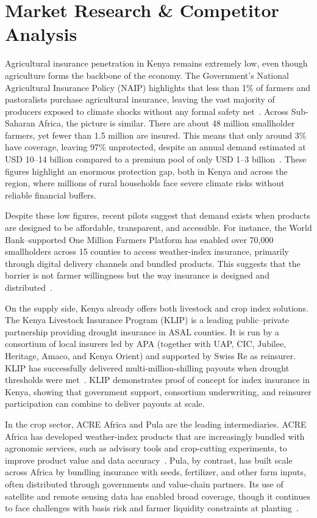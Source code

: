 \documentclass[11pt,a4paper]{article}
\begin{document}
		\section{Market Research \& Competitor Analysis}\label{sec:marketresearch}
		Agricultural insurance penetration in Kenya remains extremely low, even though agriculture forms the backbone of the economy.
		The Government's National Agricultural Insurance Policy (NAIP) highlights that less than 1\% of farmers and pastoralists purchase agricultural insurance, leaving the vast majority of producers exposed to climate shocks without any formal safety net~\parencite{MinistryOfAgriculture2023}.
		Across Sub-Saharan Africa, the picture is similar.
		There are about 48 million smallholder farmers, yet fewer than 1.5 million are insured.
		This means that only around 3\% have coverage, leaving 97\% unprotected, despite an annual demand estimated at USD 10--14 billion compared to a premium pool of only USD 1--3 billion~\parencite{ACREAfrica2020}.
		These figures highlight an enormous protection gap, both in Kenya and across the region, where millions of rural households face severe climate risks without reliable financial buffers.

		Despite these low figures, recent pilots suggest that demand exists when products are designed to be affordable, transparent, and accessible.
		For instance, the World Bank–supported One Million Farmers Platform has enabled over 70,000 smallholders across 15 counties to access weather-index insurance, primarily through digital delivery channels and bundled products.
		This suggests that the barrier is not farmer willingness but the way insurance is designed and distributed~\parencite{WorldBank2022}.

		On the supply side, Kenya already offers both livestock and crop index solutions.
		The Kenya Livestock Insurance Program (KLIP) is a leading public--private partnership providing drought insurance in ASAL counties.
		It is run by a consortium of local insurers led by APA (together with UAP, CIC, Jubilee, Heritage, Amaco, and Kenya Orient) and supported by Swiss Re as reinsurer.
		KLIP has successfully delivered multi-million-shilling payouts when drought thresholds were met~\parencite{Artemis2017, BASIS2017}.
		KLIP demonstrates proof of concept for index insurance in Kenya, showing that government support, consortium underwriting, and reinsurer participation can combine to deliver payouts at scale.

		In the crop sector, ACRE Africa and Pula are the leading intermediaries.
		ACRE Africa has developed weather-index products that are increasingly bundled with agronomic services, such as advisory tools and crop-cutting experiments, to improve product value and data accuracy~\parencite{ACREAfrica2024}.
		Pula, by contrast, has built scale across Africa by bundling insurance with seeds, fertilizer, and other farm inputs, often distributed through governments and value-chain partners.
		Its use of satellite and remote sensing data has enabled broad coverage, though it continues to face challenges with basis risk and farmer liquidity constraints at planting~\parencite{MunichReFoundation2022, UNSGSA2023}.
\end{document}
